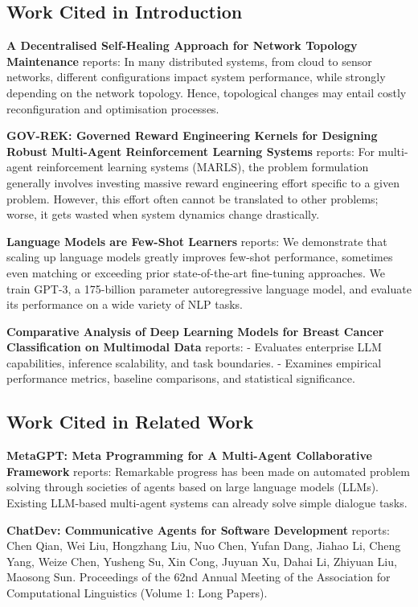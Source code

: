 \documentclass{article}
\begin{document}
\subsection{Work Cited in Introduction}


\textbf{A Decentralised Self-Healing Approach for Network Topology Maintenance} \cite{arxiv_2010_11146} reports: In many distributed systems, from cloud to sensor networks, different configurations impact system performance, while strongly depending on the network topology. Hence, topological changes may entail costly reconfiguration and optimisation processes.

\textbf{GOV-REK: Governed Reward Engineering Kernels for Designing Robust Multi-Agent Reinforcement Learning Systems} \cite{arxiv_2404_01131} reports: For multi-agent reinforcement learning systems (MARLS), the problem formulation generally involves investing massive reward engineering effort specific to a given problem. However, this effort often cannot be translated to other problems; worse, it gets wasted when system dynamics change drastically.

\textbf{Language Models are Few-Shot Learners} \cite{arxiv_2005_14165} reports: We demonstrate that scaling up language models greatly improves few-shot performance, sometimes even matching or exceeding prior state-of-the-art fine-tuning approaches. We train GPT-3, a 175-billion parameter autoregressive language model, and evaluate its performance on a wide variety of NLP tasks.

\textbf{Comparative Analysis of Deep Learning Models for Breast Cancer Classification on Multimodal Data} \cite{crossref_10_1145_3689096_3689462} reports: - Evaluates enterprise LLM capabilities, inference scalability, and task boundaries. - Examines empirical performance metrics, baseline comparisons, and statistical significance.


\subsection{Work Cited in Related Work}


\textbf{MetaGPT: Meta Programming for A Multi-Agent Collaborative Framework} \cite{crossref_10_48550_arxiv_2308_00352} reports: Remarkable progress has been made on automated problem solving through societies of agents based on large language models (LLMs). Existing LLM-based multi-agent systems can already solve simple dialogue tasks.

\textbf{ChatDev: Communicative Agents for Software Development} \cite{crossref_10_18653_v1_2024_acl_long_810} reports: Chen Qian, Wei Liu, Hongzhang Liu, Nuo Chen, Yufan Dang, Jiahao Li, Cheng Yang, Weize Chen, Yusheng Su, Xin Cong, Juyuan Xu, Dahai Li, Zhiyuan Liu, Maosong Sun. Proceedings of the 62nd Annual Meeting of the Association for Computational Linguistics (Volume 1: Long Papers).
\end{document}
